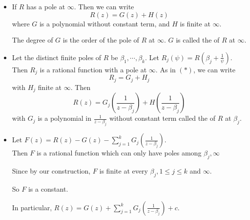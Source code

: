 \begin{itemize}
    \item If  $ R  $ has a pole at  $ \infty $. Then we can write
    \[R(z)=G(z)+H(z)\tag{$ \ast $}\]
    where  $ G  $ is a polynomial without constant term, and  $ H  $ is finite at  $ \infty  $.
    
    The degree of  $ G  $ is the order of the pole of  $ R  $ at  $ \infty  $.  $ G  $ is called the  of  $ R  $ at  $ \infty $.
    \item Let the distinct finite poles of  $ R  $ be  $ \beta_1,\cdots,\beta_k $. Let  $ R_j(\psi)=R(\beta_j+\frac{1 }{\psi}) $. Then  $ R_j  $ is a rational function with a pole at  $ \infty  $. As in  $ (\ast) $, we can write 
    \[R_j=G_j+H_j\]
    with  $ H_j  $ finite at  $ \infty $. Then 
    \[R(z)=G_j(\frac{1 }{z-\beta_j})+H(\frac{1 }{z-\beta_j})\]
    with  $ G_j  $ is a polynomial in  $ \frac{1 }{z-\beta_j} $ without constant term called the  of  $ R  $ at  $ \beta_j $.
    \item Let  $ F(z)=R(z)-G(z)-\sum\limits_{j=1}^kG_j(\frac{1 }{z-\beta_j}) $.\\
    Then  $ F  $ is a rational function which can only have poles among $ \beta_j,\infty $ 
    
    Since by our construction,  $  F  $ is finite at every  $ \beta_j,1 \leq j \leq k  $ and  $ \infty $.
    
    So  $ F  $ is a constant.
    
    In particular,  $ R(z)=G(z)+\sum\limits_{j=1}^kG_j(\frac{1 }{z-\beta_j})+c $.   
\end{itemize}
